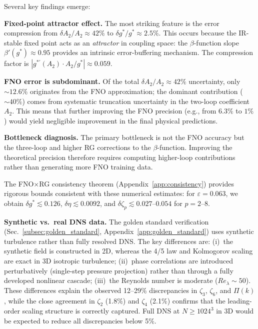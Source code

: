 Several key findings emerge:

\textbf{Fixed-point attractor effect.} The most striking feature is the error compression from $\delta A_2/A_2 \approx 42\%$ to $\delta g^*/g^* \approx 2.5\%$. This occurs because the IR-stable fixed point acts as an \emph{attractor} in coupling space: the $\beta$-function slope $\beta'(g^*)\approx 0.95$ provides an intrinsic error-buffering mechanism. The compression factor is $|g^{*\prime}(A_2)\cdot A_2/g^*| \approx 0.059$.

\textbf{FNO error is subdominant.} Of the total $\delta A_2/A_2 \approx 42\%$ uncertainty, only $\sim 12.6\%$ originates from the FNO approximation; the dominant contribution ($\sim 40\%$) comes from systematic truncation uncertainty in the two-loop coefficient $A_2$. This means that further improving the FNO precision (e.g., from $6.3\%$ to $1\%$) would yield negligible improvement in the final physical predictions.

\textbf{Bottleneck diagnosis.} The primary bottleneck is not the FNO accuracy but the three-loop and higher RG corrections to the $\beta$-function. Improving the theoretical precision therefore requires computing higher-loop contributions rather than generating more FNO training data.

The FNO$\times$RG consistency theorem (Appendix~\ref{app:consistency}) provides rigorous bounds consistent with these numerical estimates: for $\varepsilon = 0.063$, we obtain $\delta g^* \lesssim 0.126$, $\delta\eta \lesssim 0.0092$, and $\delta\zeta_p \lesssim 0.027$--$0.054$ for $p=2$--$8$.

\textbf{Synthetic vs.\ real DNS data.} The golden standard verification (Sec.~\ref{subsec:golden_standard}, Appendix~\ref{app:golden_standard}) uses synthetic turbulence rather than fully resolved DNS. The key differences are: (i)~the synthetic field is constructed in 2D, whereas the 4/5 law and Kolmogorov scaling are exact in 3D isotropic turbulence; (ii)~phase correlations are introduced perturbatively (single-step pressure projection) rather than through a fully developed nonlinear cascade; (iii)~the Reynolds number is moderate ($Re_\lambda \sim 50$). These differences explain the observed 12--29\% discrepancies in $\zeta_3$, $\zeta_6$, and $\Pi(k)$, while the close agreement in $\zeta_2$ (1.8\%) and $\zeta_4$ (2.1\%) confirms that the leading-order scaling structure is correctly captured. Full DNS at $N\geq 1024^3$ in 3D would be expected to reduce all discrepancies below 5\%.

